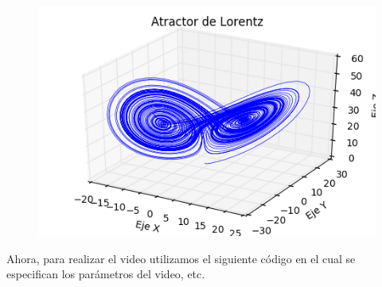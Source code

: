  \begin{figure}[ht!]
 \centering
 \includegraphics[scale=0.5]{1.png}
 \end{figure}
 
 Ahora, para realizar el video utilizamos el siguiente código en el cual se especifican los parámetros del video, etc.
 
